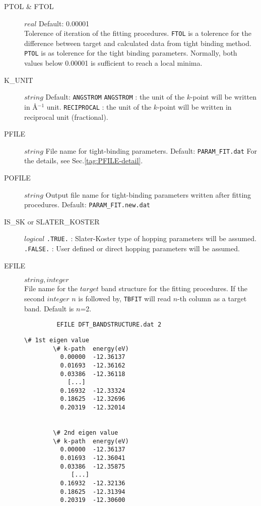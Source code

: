 \documentclass[a4paper,12pt]{scrartcl}
\makeatletter
\def\namedlabel#1#2{\begingroup
    #2%
    \def\@currentlabel{#2}%
    \phantomsection\label{#1}\endgroup
}
\newcommand{\tbfitname}{\textcolor{blue!85!white}{\texttt{TBFIT}}}
\makeatother
\begin{document}
\begin{description}
    \item[PTOL \& FTOL] $real$ Default: 0.00001\\
      	Tolerence of iteration of the fitting procedures. 
	  	\texttt{FTOL} is a tolerence for the difference between target and 
      	calculated data from tight binding method. 
	  	\texttt{PTOL} is as tolerence for the tight binding parameters.
      	Normally, both values below 0.00001 is sufficient to reach 
	  	a local minima.
    \item[K\_UNIT] $string$ Default: \texttt{ANGSTROM}
		\subitem \texttt{ANGSTROM}   : the unit of the $k$-point will be written
			in \AA$^{-1}$ unit.
		\subitem \texttt{RECIPROCAL} : the unit of the $k$-point will be written
			in reciprocal unit (fractional).
    \item [\namedlabel{tag:PFILE}{PFILE}] $string$
		File name for tight-binding parameters. Default: \texttt{PARAM\_FIT.dat}
		For the details, see Sec.\ref{tag:PFILE-detail}.
    \item[POFILE] $string$
		Output file name for tight-binding parameters written after fitting 
		procedures. Default: \texttt{PARAM\_FIT.new.dat}
    \item[\namedlabel{tag:IS_SK}{IS\_SK} or SLATER\_KOSTER] $logical$ 
		\subitem \texttt{.TRUE.}  : Slater-Koster type of hopping parameters will 
			be assumed.
		\subitem \texttt{.FALSE.}  : User defined or direct hopping parameters will 
			be assumed.
    \item[\namedlabel{tag:EFILE}{EFILE}] $string, integer$ \\
		File name for the $target$ band structure for the fitting procedures. 
		If the second $integer$ $n$ is followed by,
		\tbfitname{} will read $n$-th column as a target band. Default is $n$=2.
		\begin{verbatim}
		 EFILE DFT_BANDSTRUCTURE.dat 2
		\end{verbatim}

		\begin{Verbatim}[commandchars=\\\{\},gobble=4, frame=single, framesep=2mm, 
		   	label= EFILE DFT\_BANDSTRUCTURE.out example ,
		   	labelposition=bottomline]
        \# 1st eigen value
        \# k-path  energy(eV)
          0.00000  -12.36137  
          0.01693  -12.36162  
          0.03386  -12.36118  
            [...]
          0.16932  -12.33324  
          0.18625  -12.32696  
          0.20319  -12.32014  


        \# 2nd eigen value
        \# k-path  energy(eV)
          0.00000  -12.36137  
          0.01693  -12.36041  
          0.03386  -12.35875  
             [...]
          0.16932  -12.32136  
          0.18625  -12.31394  
          0.20319  -12.30600  



\end{Verbatim}
\end{description}
\end{document}

